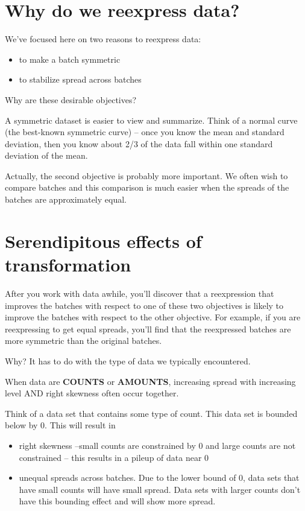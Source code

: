 \documentclass[
]{book}
\providecommand{\tightlist}{%
  \setlength{\itemsep}{0pt}\setlength{\parskip}{0pt}}
\begin{document}
\hypertarget{why-do-we-reexpress-data}{%
\section{Why do we reexpress data?}\label{why-do-we-reexpress-data}}

We've focused here on two reasons to reexpress data:

\begin{itemize}
\tightlist
\item
  to make a batch symmetric
\item
  to stabilize spread across batches
\end{itemize}

Why are these desirable objectives?

A symmetric dataset is easier to view and summarize. Think of a normal curve (the best-known symmetric curve) -- once you know the mean and standard deviation, then you know about 2/3 of the data fall within one standard deviation of the mean.

Actually, the second objective is probably more important. We often wish to compare batches and this comparison is much easier when the spreads of the batches are approximately equal.

\hypertarget{serendipitous-effects-of-transformation}{%
\section{Serendipitous effects of transformation}\label{serendipitous-effects-of-transformation}}

After you work with data awhile, you'll discover that a reexpression that improves the batches with respect to one of these two objectives is likely to improve the batches with respect to the other objective. For example, if you are reexpressing to get equal spreads, you'll find that the reexpressed batches are more symmetric than the original batches.

Why? It has to do with the type of data we typically encountered.

When data are \textbf{COUNTS} or \textbf{AMOUNTS}, increasing spread with increasing level AND right skewness often occur together.

Think of a data set that contains some type of count. This data set is bounded below by 0. This will result in

\begin{itemize}
\tightlist
\item
  right skewness --small counts are constrained by 0 and large counts are not constrained -- this results in a pileup of data near 0
\item
  unequal spreads across batches. Due to the lower bound of 0, data sets that have small counts will have small spread. Data sets with larger counts don't have this bounding effect and will show more spread.
\end{itemize}
\end{document}
